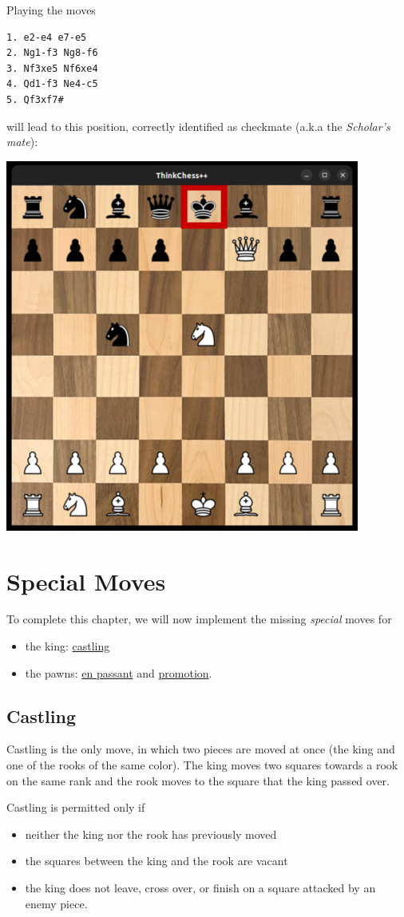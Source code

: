 Playing the moves
\begin{verbatim}
1. e2-e4 e7-e5
2. Ng1-f3 Ng8-f6
3. Nf3xe5 Nf6xe4
4. Qd1-f3 Ne4-c5
5. Qf3xf7#
\end{verbatim}

will lead to this position, correctly identified as checkmate (a.k.a
the \emph{Scholar's mate}):

\begin{center}
\includegraphics[width=.5\linewidth]{img/checkmate.jpg}
\end{center}

\section{Special Moves}\label{sec:specmoves}

To complete this chapter, we will now implement the missing \emph{special} moves for
\begin{itemize}
  \item the king: \href{https://en.wikipedia.org/wiki/Castling}{castling}
  \item the pawns: \href{https://en.wikipedia.org/wiki/En_passant}{en passant} and
    \href{https://en.wikipedia.org/wiki/Promotion_(chess)}{promotion}.
\end{itemize}

\subsection{Castling}

Castling is the only move, in which two pieces are moved at once (the king and one
of the rooks of the same color).
The king moves two squares towards a rook on the same rank and the rook moves to the square
that the king passed over.

Castling is permitted only if
\begin{itemize}
  \item neither the king nor the rook has previously moved
  \item the squares between the king and the rook are vacant
  \item the king does not leave, cross over, or finish on a square attacked by an enemy piece.
\end{itemize}

